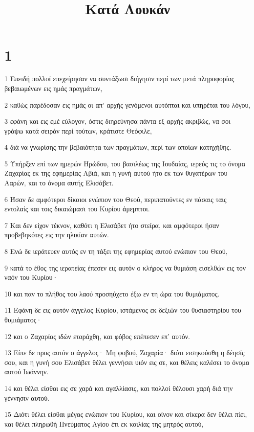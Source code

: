 

\title{Κατά Λουκάν}


\chapter{1}

\par 1 Επειδή πολλοί επεχείρησαν να συντάξωσι διήγησιν περί των μετά πληροφορίας βεβαιωμένων εις ημάς πραγμάτων,
\par 2 καθώς παρέδοσαν εις ημάς οι απ' αρχής γενόμενοι αυτόπται και υπηρέται του λόγου,
\par 3 εφάνη και εις εμέ εύλογον, όστις διηρεύνησα πάντα εξ αρχής ακριβώς, να σοι γράψω κατά σειράν περί τούτων, κράτιστε Θεόφιλε,
\par 4 διά να γνωρίσης την βεβαιότητα των πραγμάτων, περί των οποίων κατηχήθης.
\par 5 Υπήρξεν επί των ημερών Ηρώδου, του βασιλέως της Ιουδαίας, ιερεύς τις το όνομα Ζαχαρίας εκ της εφημερίας Αβιά, και η γυνή αυτού ήτο εκ των θυγατέρων του Ααρών, και το όνομα αυτής Ελισάβετ.
\par 6 Ήσαν δε αμφότεροι δίκαιοι ενώπιον του Θεού, περιπατούντες εν πάσαις ταις εντολαίς και τοις δικαιώμασι του Κυρίου άμεμπτοι.
\par 7 Και δεν είχον τέκνον, καθότι η Ελισάβετ ήτο στείρα, και αμφότεροι ήσαν προβεβηκότες εις την ηλικίαν αυτών.
\par 8 Ενώ δε ιεράτευεν αυτός εν τη τάξει της εφημερίας αυτού ενώπιον του Θεού,
\par 9 κατά το έθος της ιερατείας έπεσεν εις αυτόν ο κλήρος να θυμιάση εισελθών εις τον ναόν του Κυρίου·
\par 10 και παν το πλήθος του λαού προσηύχετο έξω εν τη ώρα του θυμιάματος.
\par 11 Εφάνη δε εις αυτόν άγγελος Κυρίου, ιστάμενος εκ δεξιών του θυσιαστηρίου του θυμιάματος·
\par 12 και ο Ζαχαρίας ιδών εταράχθη, και φόβος επέπεσεν επ' αυτόν.
\par 13 Είπε δε προς αυτόν ο άγγελος· Μη φοβού, Ζαχαρία· διότι εισηκούσθη η δέησίς σου, και η γυνή σου Ελισάβετ θέλει γεννήσει υιόν εις σε, και θέλεις καλέσει το όνομα αυτού Ιωάννην.
\par 14 και θέλει είσθαι εις σε χαρά και αγαλλίασις, και πολλοί θέλουσι χαρή διά την γέννησιν αυτού.
\par 15 Διότι θέλει είσθαι μέγας ενώπιον του Κυρίου, και οίνον και σίκερα δεν θέλει πίει, και θέλει πληρωθή Πνεύματος Αγίου έτι εκ κοιλίας της μητρός αυτού,

